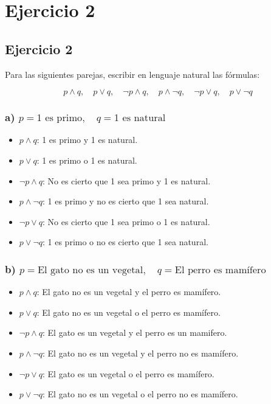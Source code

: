 \chapter*{Ejercicio 2}
\section*{Ejercicio 2}

Para las siguientes parejas, escribir en lenguaje natural las fórmulas:

\[
p \land q, \quad p \lor q,\quad \neg p \land q, \quad p \land \neg q, \quad \neg p \lor q, \quad p \lor \neg q
\]

\subsection*{a) $p = 1 \text{ es primo}, \quad q = 1 \text{ es natural}$}

\begin{itemize}
    \item $p \land q$: 1 es primo y 1 es natural.
    \item $p \lor q$: 1 es primo o 1 es natural.
    \item $\neg p \land q$: No es cierto que 1 sea primo y 1 es natural.
    \item $p \land \neg q$: 1 es primo y no es cierto que 1 sea natural.
    \item $\neg p \lor q$: No es cierto que 1 sea primo o 1 es natural.
    \item $p \lor \neg q$: 1 es primo o no es cierto que 1 sea natural.
\end{itemize}

\subsection*{b) $p = \text{El gato no es un vegetal}, \quad q = \text{El perro es mamífero}$}

\begin{itemize}
    \item $p \land q$: El gato no es un vegetal y el perro es mamífero.
    \item $p \lor q$: El gato no es un vegetal o el perro es mamífero.
    \item $\neg p \land q$: El gato es un vegetal y el perro es un mamifero.
    \item $p \land \neg q$: El gato no es un vegetal y el perro no es mamífero.
    \item $\neg p \lor q$: El gato es un vegetal o el perro es mamífero.
    \item $p \lor \neg q$: El gato no es un vegetal o el perro no es mamífero.
\end{itemize}

